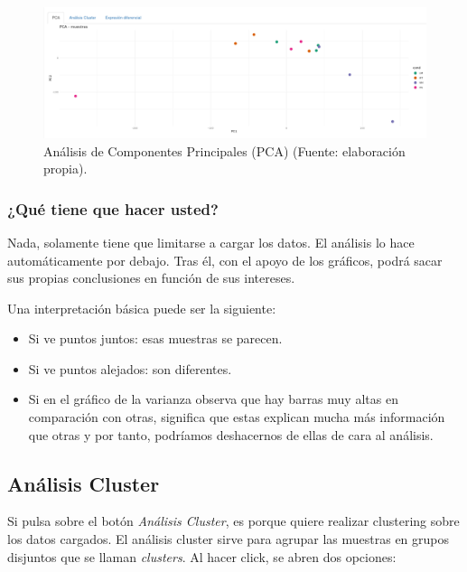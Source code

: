 \begin{figure}[H]
    \centering
    \includegraphics[width=1\textwidth]{../img/pca.png}
    \caption{Análisis de Componentes Principales (PCA) (Fuente: elaboración propia).}
\end{figure}

\subsubsection{¿Qué tiene que hacer usted?}

Nada, solamente tiene que limitarse a cargar los datos. El análisis lo hace automáticamente por debajo. Tras él, con el apoyo
de los gráficos, podrá sacar sus propias conclusiones en función de sus intereses. \newline

Una interpretación básica puede ser la siguiente: 

\begin{itemize}
    \item Si ve puntos juntos: esas muestras se parecen.
    \item Si ve puntos alejados: son diferentes.
    \item Si en el gráfico de la varianza observa que hay barras muy altas en comparación con otras, significa que estas explican
    mucha más información que otras y por tanto, podríamos deshacernos de ellas de cara al análisis.
\end{itemize}

\subsection{Análisis Cluster}

Si pulsa sobre el botón \textit{Análisis Cluster}, es porque quiere realizar clustering sobre los datos cargados. El análisis cluster sirve para 
agrupar las muestras en grupos disjuntos que se llaman \textit{clusters}. Al hacer click, se abren dos opciones:

